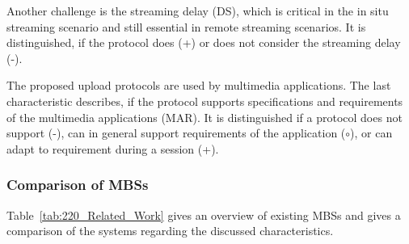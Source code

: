Another challenge is the streaming delay (DS), which is critical in the in situ streaming scenario and still essential in remote streaming scenarios.
It is distinguished, if the protocol does (+) or does not consider the streaming delay (-).

The proposed upload protocols are used by multimedia applications.
The last characteristic describes, if the protocol supports specifications and requirements of the multimedia applications (MAR).
It is distinguished if a protocol does not support (-), can in general support requirements of the application ($\circ$), or can adapt to requirement during a session (+).
\subsubsection{Comparison of MBSs}
\label{sec:220_existing_mbs}
Table~\ref{tab:220_Related_Work} gives an overview of existing \ac{MBS}s and gives a comparison of the systems regarding the discussed characteristics. 
